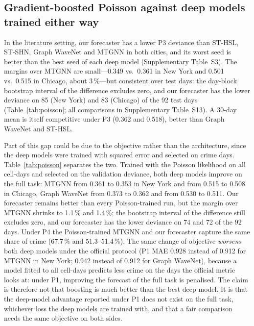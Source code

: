 \documentclass[preprint,12pt,authoryear]{elsarticle}
\begin{document}
\subsection{Gradient-boosted Poisson against deep models trained either way}\label{sec:res-simple}
In the literature setting, our forecaster has a lower P3 deviance than ST-HSL, ST-SHN, Graph WaveNet and MTGNN in both cities, and its worst seed is better than the best seed of each deep model (Supplementary Table~S3). The margins over MTGNN are small---0.349 vs.\ 0.361 in New York and 0.501 vs.\ 0.515 in Chicago, about 3\,\%---but consistent over test days: the day-block bootstrap interval of the difference excludes zero, and our forecaster has the lower deviance on 85 (New York) and 83 (Chicago) of the 92 test days (Table~\ref{tab:poisson}; all comparisons in Supplementary Table~S13). A 30-day mean is itself competitive under P3 (0.362 and 0.518), better than Graph WaveNet and ST-HSL.

Part of this gap could be due to the objective rather than the architecture, since the deep models were trained with squared error and selected on crime days. Table~\ref{tab:poisson} separates the two. Trained with the Poisson likelihood on all cell-days and selected on the validation deviance, both deep models improve on the full task: MTGNN from 0.361 to 0.353 in New York and from 0.515 to 0.508 in Chicago, Graph WaveNet from 0.373 to 0.362 and from 0.530 to 0.511. Our forecaster remains better than every Poisson-trained run, but the margin over MTGNN shrinks to 1.1\,\% and 1.4\,\%; the bootstrap interval of the difference still excludes zero, and our forecaster has the lower deviance on 74 and 72 of the 92 days. Under P4 the Poisson-trained MTGNN and our forecaster capture the same share of crime (67.7\,\% and 51.3--51.4\,\%). The same change of objective \emph{worsens} both deep models under the official protocol (P1 MAE 0.928 instead of 0.912 for MTGNN in New York; 0.942 instead of 0.912 for Graph WaveNet), because a model fitted to all cell-days predicts less crime on the days the official metric looks at: under P1, improving the forecast of the full task is penalised. The claim is therefore not that boosting is much better than the best deep model. It is that the deep-model advantage reported under P1 does not exist on the full task, whichever loss the deep models are trained with, and that a fair comparison needs the same objective on both sides.


\end{document}
